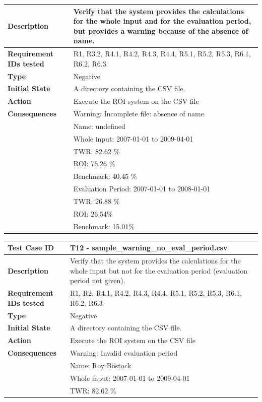 \documentclass[runningheads,12pt]{article}
\begin{document}
{\begin{tabular}{|p{1.2in}|p{4in}|}
\hline
\textbf{Description} & Verify that the system provides the calculations for the whole input and for the evaluation period, but provides a warning because of the absence of name.\\
\hline
\textbf{Requirement IDs tested} & R1, R3.2, R4.1, R4.2, R4.3, R4.4, R5.1, R5.2, R5.3, R6.1, R6.2, R6.3 \\ 
\hline
\textbf{Type} & Negative \\ 
\hline
\textbf{Initial State} & A directory containing the CSV file.\\
\hline 
\textbf{Action} & Execute the ROI system on the CSV file \\
\hline 
\textbf{Consequences} & Warning: Incomplete file: absence of name\\
& Name: undefined\\
& Whole input: 2007-01-01 to 2009-04-01\\
& TWR:  82.62 $\%$\\
& ROI: 76.26 $\%$\\
& Benchmark: 40.45 $\%$ \\ 
& Evaluation Period: 2007-01-01 to 2008-01-01\\
& TWR: 26.88 $\%$\\
& ROI: 26.54$\%$\\
& Benchmark: 15.01$\%$ \\ 
\hline
\end{tabular}
\bigskip
\centering
\begin{tabular}{|p{1.2in}|p{4in}|}
\hline
\textbf{Test Case ID} & T12 - sample\_warning\_no\_eval\_period.csv \\ 
\hline
\textbf{Description} & Verify that the system provides the calculations for the whole input but not for the evaluation period (evaluation period not given).\\
\hline
\textbf{Requirement IDs tested} & R1, R2, R4.1, R4.2, R4.3, R4.4, R5.1, R5.2, R5.3, R6.1, R6.2, R6.3 \\ 
\hline
\textbf{Type} & Negative \\ 
\hline
\textbf{Initial State} & A directory containing the CSV file.\\
\hline 
\textbf{Action} & Execute the ROI system on the CSV file \\
\hline 
\textbf{Consequences} & Warning: Invalid evaluation period\\
& Name: Roy Bostock\\
& Whole input: 2007-01-01 to 2009-04-01\\
& TWR:  82.62 $\%$\\

\end{tabular}}
\end{document}
